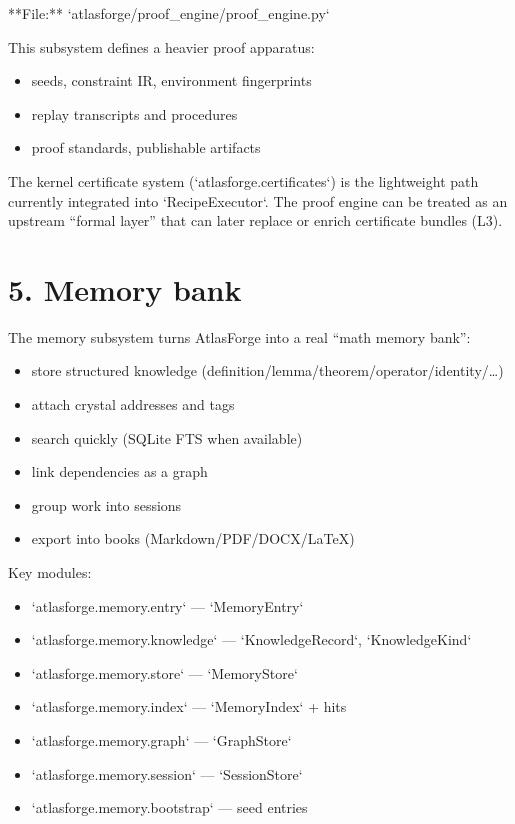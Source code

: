 \documentclass[11pt]{article}
\begin{document}
**File:** `atlasforge/proof\_engine/proof\_engine.py`

This subsystem defines a heavier proof apparatus:
\begin{itemize}
\item seeds, constraint IR, environment fingerprints
\item replay transcripts and procedures
\item proof standards, publishable artifacts
\end{itemize}

The kernel certificate system (`atlasforge.certificates`) is the lightweight path currently integrated into `RecipeExecutor`.  
The proof engine can be treated as an upstream “formal layer” that can later replace or enrich certificate bundles (L3).

\section{5. Memory bank}

The memory subsystem turns AtlasForge into a real “math memory bank”:

\begin{itemize}
\item store structured knowledge (definition/lemma/theorem/operator/identity/…)
\item attach crystal addresses and tags
\item search quickly (SQLite FTS when available)
\item link dependencies as a graph
\item group work into sessions
\item export into books (Markdown/PDF/DOCX/LaTeX)
\end{itemize}

Key modules:

\begin{itemize}
\item `atlasforge.memory.entry` — `MemoryEntry`
\item `atlasforge.memory.knowledge` — `KnowledgeRecord`, `KnowledgeKind`
\item `atlasforge.memory.store` — `MemoryStore`
\item `atlasforge.memory.index` — `MemoryIndex` + hits
\item `atlasforge.memory.graph` — `GraphStore`
\item `atlasforge.memory.session` — `SessionStore`
\item `atlasforge.memory.bootstrap` — seed entries
\end{itemize}
\end{document}
